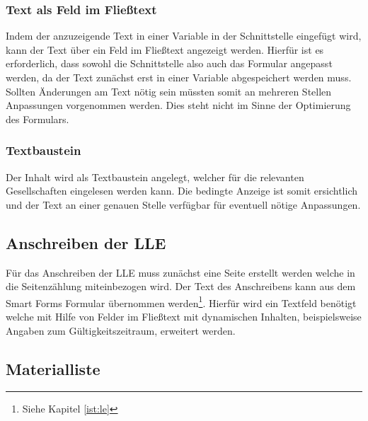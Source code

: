 \subsubsection{Text als Feld im Fließtext}

Indem der anzuzeigende Text in einer Variable in der Schnittstelle eingefügt wird, kann der Text über ein Feld im Fließtext angezeigt werden. Hierfür ist es erforderlich, dass sowohl die Schnittstelle also auch das Formular angepasst werden, da der Text zunächst erst in einer Variable abgespeichert werden muss. Sollten Änderungen am Text nötig sein müssten somit an mehreren Stellen Anpassungen vorgenommen werden. Dies steht nicht im Sinne der Optimierung des Formulars.

\subsubsection{Textbaustein}

Der Inhalt wird als Textbaustein angelegt, welcher für die relevanten Gesellschaften eingelesen werden kann. Die bedingte Anzeige ist somit ersichtlich und der Text an einer genauen Stelle verfügbar für eventuell nötige Anpassungen. 

\subsection{Anschreiben der \acs{LLE}}

Für das Anschreiben der \ac{LLE} muss zunächst eine Seite erstellt werden welche in die Seitenzählung miteinbezogen wird. Der Text des Anschreibens kann aus dem Smart Forms Formular übernommen werden\footnote{Siehe Kapitel \ref{ist:le}}. Hierfür wird ein Textfeld benötigt welche mit Hilfe von Felder im Fließtext mit dynamischen Inhalten, beispielsweise Angaben zum Gültigkeitszeitraum, erweitert werden. 

\subsection{Materialliste}


